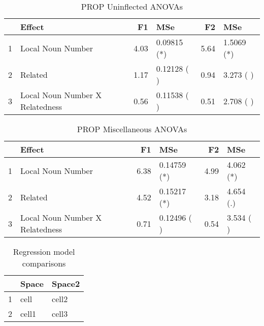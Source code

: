 \documentclass[a4paper,11pt]{article}\usepackage[]{graphicx}\usepackage[]{color}
\begin{document}
\begin{table}[ht]
\centering
\begin{tabular}{rlrlrl}
  \hline
 & Effect & F1 & MSe & F2 & MSe \\ 
  \hline
1 & Local Noun Number & 4.03 & 0.09815 (*) & 5.64 & 1.5069 (*) \\ 
  2 & Related & 1.17 & 0.12128 ( ) & 0.94 & 3.273 ( ) \\ 
  3 & Local Noun Number X Relatedness & 0.56 & 0.11538 ( ) & 0.51 & 2.708 ( ) \\ 
   \hline
\end{tabular}
\caption[PROP Uninflected ANOVAs]{PROP Uninflected ANOVAs} 
\end{table}



\begin{table}[ht]
\centering
\begin{tabular}{rlrlrl}
  \hline
 & Effect & F1 & MSe & F2 & MSe \\ 
  \hline
1 & Local Noun Number & 6.38 & 0.14759 (*) & 4.99 & 4.062 (*) \\ 
  2 & Related & 4.52 & 0.15217 (*) & 3.18 & 4.654 (.) \\ 
  3 & Local Noun Number X Relatedness & 0.71 & 0.12496 ( ) & 0.54 & 3.534 ( ) \\ 
   \hline
\end{tabular}
\caption[PROP Miscellaneous ANOVAs]{PROP Miscellaneous ANOVAs} 
\end{table}


\clearpage{}
\begin{table}[ht]
\centering
\begin{tabular}{rll}
  \hline
 & Space & Space2 \\ 
  \hline
1 & cell & cell2 \\ 
  2 & cell1 & cell3 \\ 
   \hline
\end{tabular}
\caption[Regression model comparisons]{Regression model comparisons} 
\end{table}
\end{document}
